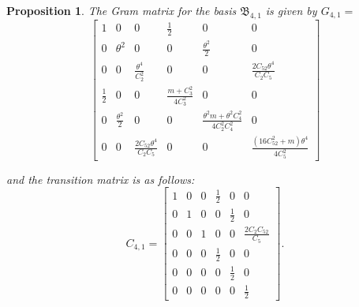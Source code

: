 \documentclass[table]{amsart}
\newtheorem{proposition}[theorem]{Proposition}
\numberwithin{equation}{section}
\begin{document}
\begin{proposition}
    The Gram matrix for the basis $\mathfrak{B}_{4, 1}$ is given by $G_{4,1}=$
    \[
\begin{bmatrix}
1 
& 0 
& 0 
& \tfrac{1}{2} 
& 0 
& 0 \\[8pt]

0 
& \theta^2 
& 0 
& 0 
& \tfrac{\theta^2}{2 } 
& 0 \\[8pt]

0 
& 0 
& \tfrac{\theta^4}{C_2^2} 
& 0 
& 0 
& \tfrac{2 C_{52} \theta^4}{C_2 C_5} \\[8pt]

\tfrac{1}{2} 
& 0 
& 0 
& \tfrac{m+C_3^2}{4 C_3^2}
& 0 
& 0 \\[8pt]

0 
& \tfrac{\theta^2}{2 } 
& 0 
& 0 
& \tfrac{\theta^2 m+\theta^2C_4^2}{4C_2^2 C_4^2}
& 0 \\[8pt]

0 
& 0 
& \tfrac{2 C_{52} \theta^4}{C_2 C_5} 
& 0 
& 0 
& \tfrac{(16 C_{52}^2+m) \theta^4}{4C_5^2} 
\end{bmatrix}
\]

and the transition matrix is as follows: 
\[
C_{4,1}=\begin{bmatrix}
1 & 0 & 0 &  \tfrac{1}{2} & 0 & 0 \\[8pt]
0 & 1 & 0 & 0 & \tfrac{1}{2} & 0 \\[8pt]
0 & 0 & 1 & 0 & 0 & \tfrac{2C_2 C_{52}}{C_5} \\[8pt]
0 & 0 & 0 &  \tfrac{1}{2} & 0 & 0 \\[8pt]
0 & 0 & 0 & 0 & \tfrac{1}{2} & 0 \\[8pt]
0 & 0 & 0 & 0 & 0 & \tfrac{1}{2}
\end{bmatrix}.
\]
\end{proposition}
\end{document}
